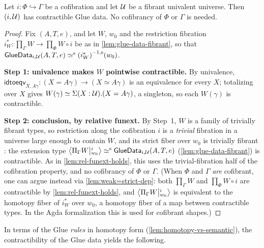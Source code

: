 \begin{theorem}\label{thm:ua-implies-strong-glue}
	Let $i:\Phi\hookrightarrow\Gamma$ be a cofibration and let $\UU$ be a
	fibrant univalent universe. Then $(i,\UU)$ has contractible Glue data. No
	cofibrancy of $\Phi$ or $\Gamma$ is needed.
\end{theorem}
\begin{proof}
	Fix $(A,T,e)$, and let $W$, $w_0$ and the restriction fibration
	$i^*_W:\prod_\Gamma W\to\prod_\Phi W\circ i$ be as in
	\cref{lem:glue-data-fibrant}, so that
	$\mathsf{GlueData}_{i,\UU}(A,T,e)\siso \sfib{(i^*_W)}(w_0)$.

	\smallskip\noindent\textbf{Step 1: univalence makes $W$ pointwise contractible.}
	By univalence, $\mathsf{idtoeqv}_{X,A\gamma}:(X=A\gamma)\to(X\simeq A\gamma)$ is an
	equivalence for every $X$; totalizing over $X$ \citep[\S4.7]{HoTTBook} gives
	$W(\gamma)\simeq\Sigma(X:\UU).(X=A\gamma)$, a singleton, so each $W(\gamma)$ is
	contractible.

	\smallskip\noindent\textbf{Step 2: conclusion, by relative funext.}
	By Step~1, $W$ is a family of trivially fibrant types, so restriction along
	the cofibration $i$ is a \emph{trivial} fibration \citep[Lem.~3.18]{2LTT}
	in a universe large enough to contain $W$, and its strict fiber
	over $w_0$ is trivially fibrant \citep[Def.~3.7]{2LTT}: the extension type
	$\Ext{i}{\Pi_\Gamma W}{w_0}\siso\mathsf{GlueData}_{i,\UU}(A,T,e)$
	(\cref{lem:glue-data-fibrant}) is contractible. As in
	\cref{lem:rel-funext-holds}, this uses the trivial-fibration half of the
	cofibration property, and no cofibrancy of $\Phi$ or $\Gamma$.
	(When $\Phi$ and $\Gamma$ \emph{are} cofibrant, one can argue instead via
	\cref{lem:weak=strict-dep}: both $\prod_\Gamma W$ and $\prod_\Phi W\circ i$
	are contractible by \cref{lem:rel-funext-holds}, and
	$\Ext{i}{\Pi_\Gamma W}{w_0}$ is equivalent to the homotopy fiber of $i^*_W$ over
	$w_0$, a homotopy fiber of a map between contractible types. In the Agda
	formalization this is used for cofibrant shapes.)
\end{proof}

In terms of the Glue \emph{rules} in homotopy form
(\cref{lem:homotopy-vs-semantic}),
the contractibility of the Glue data yields the following.

